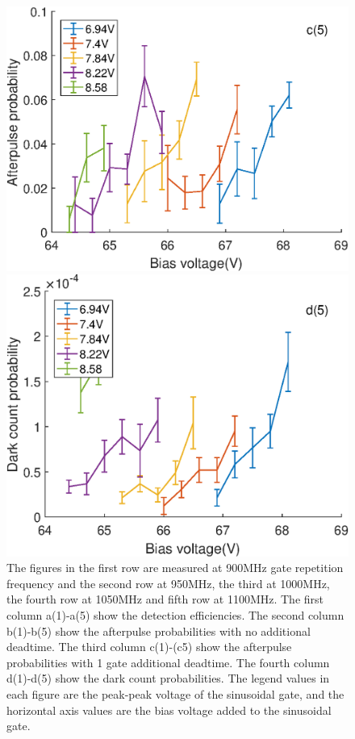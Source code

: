 \documentclass[%
 reprint,
superscriptaddress,
 amsmath,amssymb,
 aps,
]{revtex4-1}
\begin{document}
\begin{figure}
\begin{minipage}{0.24\linewidth}
\includegraphics[width = 1\textwidth]{figure/110M/afterpulse1.eps}%
\end{minipage}
\begin{minipage}{0.24\linewidth}
\centering
\includegraphics[width = 1\textwidth]{figure/110M/darkcount.eps}%
\end{minipage}
\vskip -0.1in
\caption{\label{fig:specifics}The figures in the first row are measured at 900MHz gate repetition frequency and the second row at 950MHz, the third at 1000MHz, the fourth row at 1050MHz and fifth row at 1100MHz. The first column a(1)-a(5) show the detection efficiencies. The second column b(1)-b(5) show the afterpulse probabilities with no additional deadtime. The third column c(1)-(c5) show the afterpulse probabilities with 1 gate additional deadtime. The fourth column d(1)-d(5) show the dark count probabilities. The legend values in each figure are the peak-peak voltage of the sinusoidal gate, and the horizontal axis values are the bias voltage added to the sinusoidal gate.}
\vskip -0.2in
\end{figure}
\end{document}
